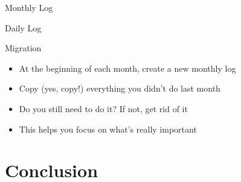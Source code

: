 \documentclass[aspectratio=169]{beamer}
\begin{document}
    {
    \begin{frame}{Monthly Log}
    \end{frame}
    }

    {
    \begin{frame}{Daily Log}
    \end{frame}
    }

    {
    \begin{frame}{Migration}
        \begin{itemize}
            \item At the beginning of each month, create a new monthly log
            \item Copy (yes, \alert{copy}!) everything you didn't do last month
            \item Do you still need to do it? If not, get rid of it
            \item This helps you focus on what's \alert{really} important
        \end{itemize}
    \end{frame}
    }

    \section{Conclusion}
\end{document}
